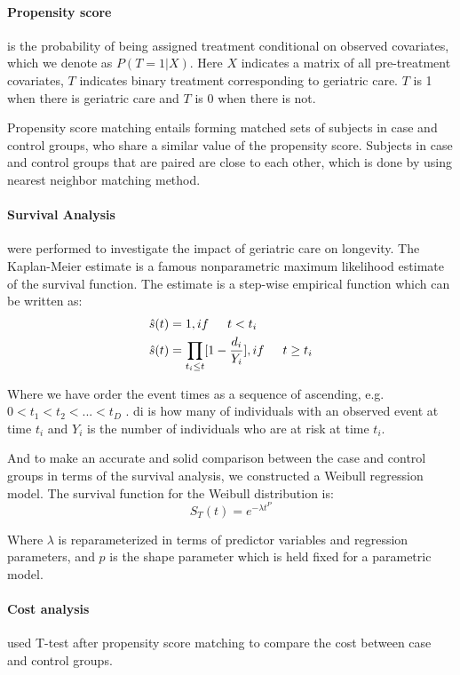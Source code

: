 \documentclass{article}
\begin{document}
	\paragraph{Propensity score}is the probability of being assigned treatment conditional on observed covariates, which we denote as $P(T=1|X)$. Here $X$ indicates a matrix of all pre-treatment covariates, $T$ indicates binary treatment corresponding to geriatric care. $T$ is 1 when there is geriatric care and $T$ is 0 when there is not. 
	
	Propensity score matching entails forming matched sets of subjects in case and control groups, who share a similar value of the propensity score. Subjects in case and control groups that are paired are close to each other, which is done by using nearest neighbor matching method.
	
	\paragraph{Survival Analysis} were performed to investigate the impact of geriatric care on longevity. The Kaplan-Meier estimate is a famous nonparametric maximum likelihood estimate of the survival function. The estimate is a step-wise empirical function which can be written as:
	\begin{align*}
	\hat{s}(t) &= 1, if \indent t < t_i\\
	\hat{s}(t) &= \prod_{t_i\le t}[1 - \frac{d_i}{Y_i}], if \indent t \ge t_i
	\end{align*} 
	
	Where we have order the event times as a sequence of ascending, e.g. $0 < t_1 < t_2 < ... < t_D$ . di is how many of individuals with an observed event at time $t_i$ and $Y_i$ is the number of individuals who are at risk at time $t_i$.
	
	And to make an accurate and solid comparison between the case and control groups in terms of the survival analysis, we constructed a Weibull regression model. The survival function for the Weibull distribution is:
	$$S_T(t) = e^{-\lambda t^P} $$
	
	Where $\lambda$ is reparameterized in terms of predictor variables and regression parameters, and $p$ is the shape parameter which is held fixed for a parametric model.
	
	\paragraph{Cost analysis}used T-test after propensity score matching to compare the cost between case and control groups. 
\end{document}

